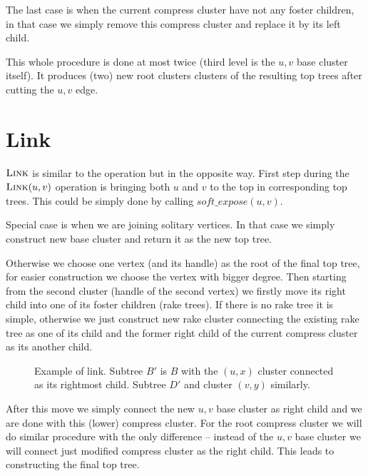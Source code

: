 The last case is when the current compress cluster have not any foster children,
in that case we simply remove this compress cluster and replace it by its left
child.

This whole procedure is done at most twice (third level is the $u,v$ base
cluster itself). It produces (two) new root clusters clusters of the resulting
top trees after cutting the $u,v$ edge.

\section{Link}

$\hbox{\sc Link}$ is similar to the \Cut{} operation but in the opposite way. First step
during the $\hbox{\sc Link}(u,v)$ operation is bringing both $u$ and $v$ to the top in
corresponding top trees. This could be simply done by calling
$soft\_expose(u,v)$.

Special case is when we are joining solitary vertices. In that case we simply
construct new base cluster and return it as the new top tree.

Otherwise we choose one vertex (and its handle) as the root of the final top tree,
for easier construction we choose the vertex with bigger degree. Then starting
from the second cluster (handle of the second vertex) we firstly move its right
child into one of its foster children (rake trees). If there is no rake tree it
is simple, otherwise we just construct new rake cluster connecting the existing
rake tree as one of its child and the former right child of the current compress
cluster as its another child.

\begin{figure}[h]
\centering
{}
\caption{Example of link. Subtree $B'$ is $B$ with the $(u,x)$ cluster connected
as its rightmost child. Subtree $D'$ and cluster $(v,y)$ similarly.}
\end{figure}

After this move we simply connect the new $u,v$ base cluster as right child and we
are done with this (lower) compress cluster. For the root compress cluster we
will do similar procedure with the only difference -- instead of the $u,v$ base
cluster we will connect just modified compress cluster as the right child. This
leads to constructing the final top tree.
